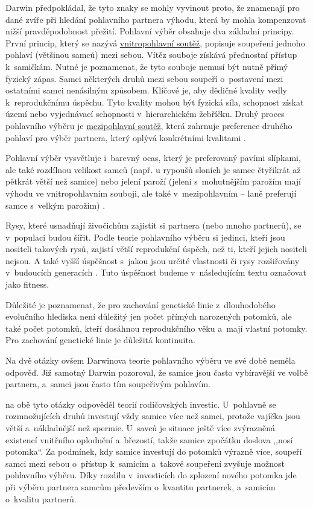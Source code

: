 \documentclass[a4paper, 12pt, notitlepage, oneside, numbers=noenddot]{report}
\begin{document}
Darwin předpokládal, že tyto znaky se mohly vyvinout proto, že
znamenají pro dané zvíře při hledání pohlavního partnera výhodu, která
by mohla kompenzovat nižší pravděpodobnost přežití.  Pohlavní výběr
obsahuje dva základní principy.  První princip, který se nazývá
\underline{vnitropohlavní soutěž}, popisuje soupeření jednoho pohlaví
(většinou samců) mezi sebou.  Vítěz souboje získává přednostní přístup
k~samičkám.  Nutné je poznamenat, že tyto souboje nemusí být nutně
přímý fyzický zápas.  Samci některých druhů mezi sebou soupeří
o~postavení mezi ostatními samci nenásilným způsobem.  Klíčové je, aby
dědičné kvality vedly k~reprodukčnímu úspěchu.  Tyto kvality mohou být
fyzická síla, schopnost získat území nebo vyjednávací schopnosti
v~hierarchickém žebříčku.  Druhý proces pohlavního výběru je
\underline{mezipohlavní soutěž}, která zahrnuje preference druhého
po\-hla\-ví pro výběr partnera, který oplývá konkrétními kvalitami
\citep{Buss2007}.

Pohlavní výběr vysvětluje i~barevný ocas, který je preferovaný pavími
slípkami, ale také rozdílnou velikost samců (např. u rypoušů sloních
je samec čtyřikrát až pětkrát větší než samice) nebo jelení paroží
(jeleni s~mohutnějším parožím mají výhodu ve vnitropohlavním souboji,
ale také v~mezipohlavním -- laně preferují samce s~velkým parožím)
\citep{Buss2007}.

Rysy, které usnadňují živočichům zajistit si partnera (nebo mnoho
partnerů), se v~po\-pu\-laci budou šířit.  Podle teorie pohlavního
výběru si jedinci, kteří jsou nositeli takových rysů, zajistí větší
reprodukční úspěch, než ti, kteří jejich nositeli nejsou.  A také
vyšší úspěšnost s~jakou jsou určité vlastnosti či rysy rozšiřovány
v~budoucích generacích \citep{BarrettDunbarLycett2007}.  Tuto
úspěšnost budeme v~následujícím textu označovat jako fitness.

Důležité je poznamenat, že pro zachování genetické linie
z~dlouhodobého evolučního hlediska není důležitý jen počet přímých
narozených potomků, ale také počet potomků, kteří dosáhnou
reprodukčního věku a~mají vlastní potomky. Pro zachování genetické
linie je důležitá kontinuita.

Na dvě otázky ovšem Darwinova teorie pohlavního výběru ve své době
neměla odpověď.  Již samotný Darwin pozoroval, že samice jsou často
vybíravější ve volbě partnera, a~samci jsou často tím soupeřivým
pohlavím.

\citet{Trivers1972} na obě tyto otázky odpověděl teorií rodičovských
investic.  U~pohlavně se rozmnožujících druhů investují vždy samice
více než samci, protože vajíčka jsou větší a~nákladnější než spermie.
U~savců je situace ještě více zvýrazněná existencí vnitřního oplodnění
a~březostí, takže samice zpočátku doslova ,,nosí potomka``.  Za podmínek,
kdy samice investují do potomků výrazně více, soupeří samci mezi sebou
o~přístup k~samicím a~takové soupeření zvyšuje možnost pohlavního
výběru.  Díky rozdílu v~investicích do zplození nového potomka jde při
výběru partnera samcům především o~kvantitu partnerek, a~samicím
o~kvalitu partnerů.
\end{document}
